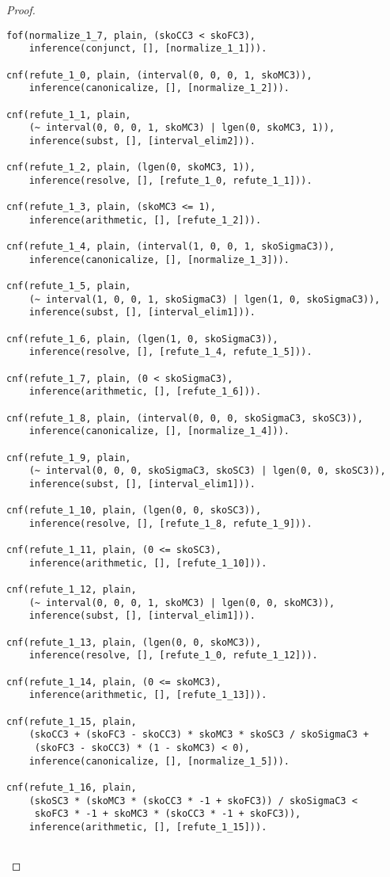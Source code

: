 \begin{proof}
\begin{verbatim}
fof(normalize_1_7, plain, (skoCC3 < skoFC3),
    inference(conjunct, [], [normalize_1_1])).

cnf(refute_1_0, plain, (interval(0, 0, 0, 1, skoMC3)),
    inference(canonicalize, [], [normalize_1_2])).

cnf(refute_1_1, plain,
    (~ interval(0, 0, 0, 1, skoMC3) | lgen(0, skoMC3, 1)),
    inference(subst, [], [interval_elim2])).

cnf(refute_1_2, plain, (lgen(0, skoMC3, 1)),
    inference(resolve, [], [refute_1_0, refute_1_1])).

cnf(refute_1_3, plain, (skoMC3 <= 1),
    inference(arithmetic, [], [refute_1_2])).

cnf(refute_1_4, plain, (interval(1, 0, 0, 1, skoSigmaC3)),
    inference(canonicalize, [], [normalize_1_3])).

cnf(refute_1_5, plain,
    (~ interval(1, 0, 0, 1, skoSigmaC3) | lgen(1, 0, skoSigmaC3)),
    inference(subst, [], [interval_elim1])).

cnf(refute_1_6, plain, (lgen(1, 0, skoSigmaC3)),
    inference(resolve, [], [refute_1_4, refute_1_5])).

cnf(refute_1_7, plain, (0 < skoSigmaC3),
    inference(arithmetic, [], [refute_1_6])).

cnf(refute_1_8, plain, (interval(0, 0, 0, skoSigmaC3, skoSC3)),
    inference(canonicalize, [], [normalize_1_4])).

cnf(refute_1_9, plain,
    (~ interval(0, 0, 0, skoSigmaC3, skoSC3) | lgen(0, 0, skoSC3)),
    inference(subst, [], [interval_elim1])).

cnf(refute_1_10, plain, (lgen(0, 0, skoSC3)),
    inference(resolve, [], [refute_1_8, refute_1_9])).

cnf(refute_1_11, plain, (0 <= skoSC3),
    inference(arithmetic, [], [refute_1_10])).

cnf(refute_1_12, plain,
    (~ interval(0, 0, 0, 1, skoMC3) | lgen(0, 0, skoMC3)),
    inference(subst, [], [interval_elim1])).

cnf(refute_1_13, plain, (lgen(0, 0, skoMC3)),
    inference(resolve, [], [refute_1_0, refute_1_12])).

cnf(refute_1_14, plain, (0 <= skoMC3),
    inference(arithmetic, [], [refute_1_13])).

cnf(refute_1_15, plain,
    (skoCC3 + (skoFC3 - skoCC3) * skoMC3 * skoSC3 / skoSigmaC3 +
     (skoFC3 - skoCC3) * (1 - skoMC3) < 0),
    inference(canonicalize, [], [normalize_1_5])).

cnf(refute_1_16, plain,
    (skoSC3 * (skoMC3 * (skoCC3 * -1 + skoFC3)) / skoSigmaC3 <
     skoFC3 * -1 + skoMC3 * (skoCC3 * -1 + skoFC3)),
    inference(arithmetic, [], [refute_1_15])).


\end{verbatim}
\end{proof}
